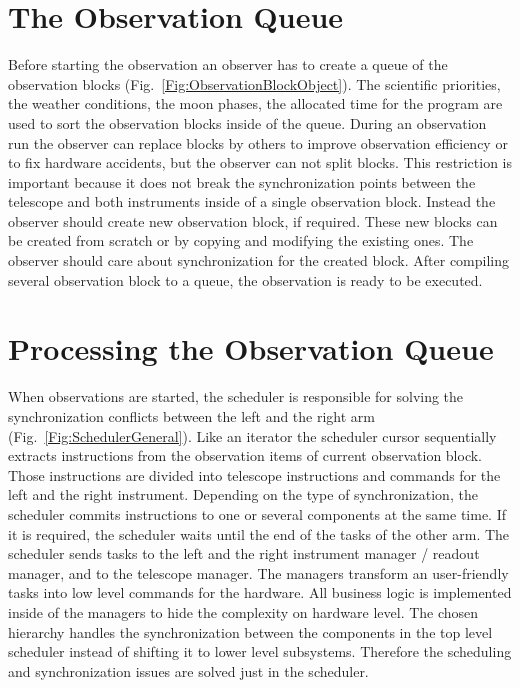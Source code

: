 \documentclass[11pt,twoside]{article}
\begin{document}
\section{The Observation Queue}


Before starting the observation an observer has to create a queue of the observation blocks (Fig.~\ref{Fig:ObservationBlockObject}).
The scientific priorities, the weather conditions, the moon phases, the allocated time for the program are used to sort the observation blocks inside of the queue.
During an observation run the observer can replace blocks by others to improve observation efficiency or to fix hardware accidents,
but the observer can not split blocks. 
This restriction is important because it does not break the synchronization points between the telescope and both instruments inside of a single observation block.
Instead the observer should create new observation block, if required. These new blocks can be created from scratch or by copying and modifying the existing ones. 
The observer should care about synchronization for the created block.
After compiling several observation block to a queue, the observation is ready to be executed.

\section{Processing the Observation Queue}

When observations are started, the scheduler is responsible for solving the synchronization conflicts between the left and the right arm (Fig.~\ref{Fig:SchedulerGeneral}).
Like an iterator the scheduler cursor sequentially extracts instructions from the observation items of current observation block.
Those instructions are divided into telescope instructions and commands for the left and the right instrument. 
Depending on the type of synchronization, the scheduler commits instructions to one or several components at the same time. 
If it is required, the scheduler waits until the end of the tasks of the other arm. 
The scheduler sends tasks to the left and the right instrument manager / readout manager, and to the telescope manager. 
The managers transform an user-friendly tasks into low level commands for the hardware.
All business logic is implemented inside of the managers to hide the complexity on hardware level. The chosen hierarchy handles the synchronization between 
the components in the top level scheduler instead of shifting it to lower level subsystems.  
Therefore the scheduling and synchronization issues are solved just in the scheduler. 
\end{document}

